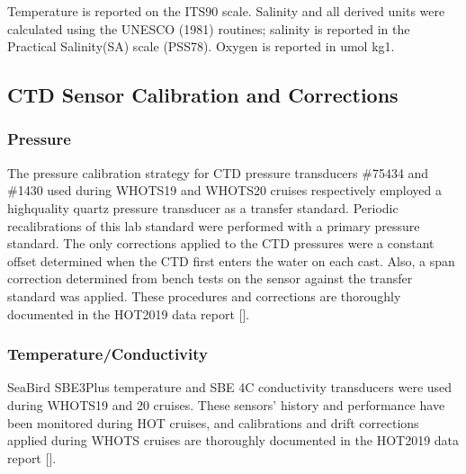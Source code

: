 \documentclass[a4paper,10pt,english,openany,oneside]{sphinxmanual}
\begin{document}
\sphinxAtStartPar
Temperature is reported on the ITS\sphinxhyphen{}90 scale. Salinity and all derived units
were calculated using the UNESCO (1981) routines; salinity is reported in the
Practical Salinity(SA) scale (PSS\sphinxhyphen{}78). Oxygen is reported in umol kg\sphinxhyphen{}1.


\subsection{CTD Sensor Calibration and Corrections}
\label{\detokenize{4_section:ctd-sensor-calibration-and-corrections}}

\subsubsection{Pressure}
\label{\detokenize{4_section:pressure}}
\sphinxAtStartPar
The pressure calibration strategy for CTD pressure transducers \#75434 and \#1430
used during WHOTS\sphinxhyphen{}19 and WHOTS\sphinxhyphen{}20 cruises respectively employed a high\sphinxhyphen{}quality
quartz pressure transducer as a transfer standard. Periodic recalibrations of
this lab standard were performed with a primary pressure standard. The only
corrections applied to the CTD pressures were a constant offset determined when
the CTD first enters the water on each cast. Also, a span correction determined
from bench tests on the sensor against the transfer standard was applied. These
procedures and corrections are thoroughly documented in the HOT\sphinxhyphen{}2019 data
report {[}{]}.


\subsubsection{Temperature/Conductivity}
\label{\detokenize{4_section:temperature-conductivity}}
\sphinxAtStartPar
Sea\sphinxhyphen{}Bird SBE\sphinxhyphen{}3\sphinxhyphen{}Plus temperature and SBE 4C conductivity transducers were used
during WHOTS\sphinxhyphen{}19 and \sphinxhyphen{}20 cruises. These sensors’ history and performance have
been monitored during HOT cruises, and calibrations and drift corrections
applied during WHOTS cruises are thoroughly documented in the HOT\sphinxhyphen{}2019 data
report {[}{]}.
\end{document}

